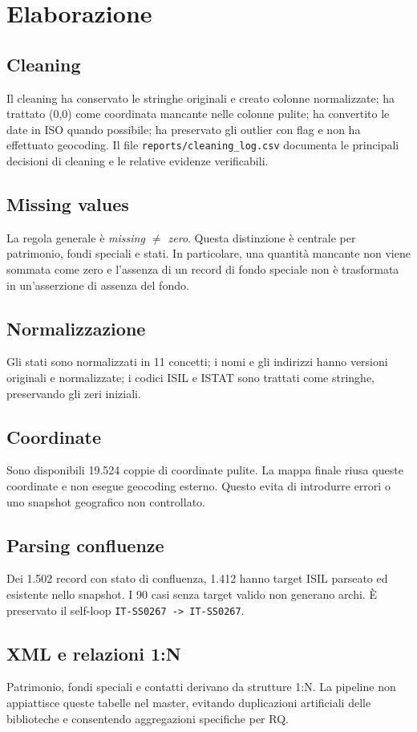 \documentclass[11pt,a4paper]{article}
\begin{document}
\section{Elaborazione}
\subsection{Cleaning}
Il cleaning ha conservato le stringhe originali e creato colonne normalizzate; ha trattato (0,0) come coordinata mancante nelle colonne pulite; ha convertito le date in ISO quando possibile; ha preservato gli outlier con flag e non ha effettuato geocoding. Il file \texttt{reports/cleaning\_log.csv} documenta le principali decisioni di cleaning e le relative evidenze verificabili.

\subsection{Missing values}
La regola generale è \emph{missing $\neq$ zero}. Questa distinzione è centrale per patrimonio, fondi speciali e stati. In particolare, una quantità mancante non viene sommata come zero e l'assenza di un record di fondo speciale non è trasformata in un'asserzione di assenza del fondo.

\subsection{Normalizzazione}
Gli stati sono normalizzati in 11 concetti; i nomi e gli indirizzi hanno versioni originali e normalizzate; i codici ISIL e ISTAT sono trattati come stringhe, preservando gli zeri iniziali.

\subsection{Coordinate}
Sono disponibili 19.524 coppie di coordinate pulite. La mappa finale riusa queste coordinate e non esegue geocoding esterno. Questo evita di introdurre errori o uno snapshot geografico non controllato.

\subsection{Parsing confluenze}
Dei 1.502 record con stato di confluenza, 1.412 hanno target ISIL parseato ed esistente nello snapshot. I 90 casi senza target valido non generano archi. È preservato il self-loop \texttt{IT-SS0267 -> IT-SS0267}.

\subsection{XML e relazioni 1:N}
Patrimonio, fondi speciali e contatti derivano da strutture 1:N. La pipeline non appiattisce queste tabelle nel master, evitando duplicazioni artificiali delle biblioteche e consentendo aggregazioni specifiche per RQ.
\end{document}
